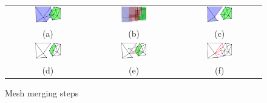 \begin{figure}[t]
\centering
\setlength{\tabcolsep}{1px}
\begin{tabular}{ccc}
\includegraphics[width=0.325\textwidth]{./img/ch-incr-dens/meshmerge01}&
\includegraphics[width=0.325\textwidth]{./img/ch-incr-dens/meshmerge03}&
\includegraphics[width=0.325\textwidth]{./img/ch-incr-dens/meshmerge04}\\
(a)&(b)&(c)\\
\includegraphics[width=0.325\textwidth]{./img/ch-incr-dens/meshmerge07}&
\includegraphics[width=0.325\textwidth]{./img/ch-incr-dens/meshmerge09}&
\includegraphics[width=0.325\textwidth]{./img/ch-incr-dens/meshmerge11}\\
(d)&(e)&(f)\\
\end{tabular}
\caption{Mesh merging steps}
\label{fig:mesh_merging}
\end{figure}
